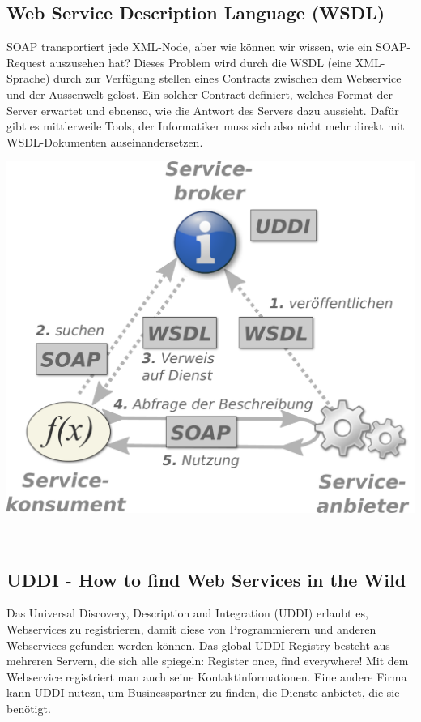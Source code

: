 \subsection{Web Service Description Language (WSDL)}
\begin{minipage}{0.6\textwidth}
SOAP transportiert jede XML-Node, aber wie können wir wissen, wie ein SOAP-Request auszusehen hat? Dieses Problem wird durch die WSDL (eine XML-Sprache) durch zur Verfügung stellen eines Contracts zwischen dem Webservice und der Aussenwelt gelöst. Ein solcher Contract definiert, welches Format der Server erwartet und ebnenso, wie die Antwort des Servers dazu aussieht. Dafür gibt es mittlerweile Tools, der Informatiker muss sich also nicht mehr direkt mit WSDL-Dokumenten auseinandersetzen.
\end{minipage}
\hfill
\begin{minipage}{0.4\textwidth}
\centering
\includegraphics[width=\textwidth]{fig/Webservice.pdf}
\end{minipage}\\
\subsection{UDDI - How to find Web Services in  the Wild}
Das Universal Discovery, Description and Integration (UDDI) erlaubt es, Webservices zu registrieren, damit diese von Programmierern und anderen Webservices gefunden werden können.
Das global UDDI Registry besteht aus mehreren Servern, die sich alle spiegeln: Register once, find everywhere!
Mit dem Webservice registriert man auch seine Kontaktinformationen. Eine andere Firma kann UDDI nutezn, um Businesspartner zu finden, die Dienste anbietet, die sie benötigt.

